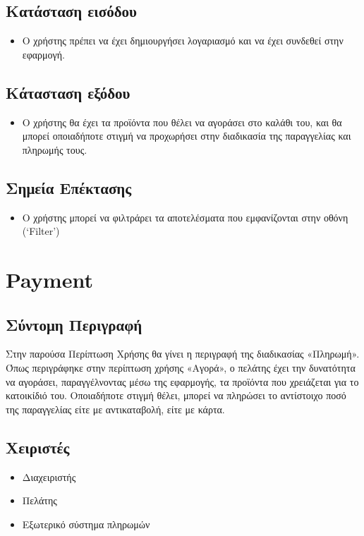 \documentclass[12pt,a4paper,twoside]{book}
\begin{document}
\subsection{Κατάσταση εισόδου} %
\begin{itemize}
  \item Ο χρήστης πρέπει να έχει δημιουργήσει λογαριασμό και να έχει συνδεθεί στην εφαρμογή. %
\end{itemize}

\subsection{Κάτασταση εξόδου} %
\begin{itemize}
  \item Ο χρήστης θα έχει τα προϊόντα που θέλει να αγοράσει στο καλάθι του, και θα μπορεί οποιαδήποτε στιγμή να προχωρήσει στην διαδικασία της παραγγελίας και πληρωμής τους. %
\end{itemize}

\subsection{Σημεία Επέκτασης}
\begin{itemize}
  \item Ο χρήστης μπορεί να φιλτράρει τα αποτελέσματα που εμφανίζονται στην οθόνη (`Filter') %
\end{itemize}

\section{Payment} %

\subsection{Σύντομη Περιγραφή}
Στην παρούσα Περίπτωση Χρήσης θα γίνει η περιγραφή της διαδικασίας «Πληρωμή». Όπως περιγράφηκε στην περίπτωση χρήσης «Αγορά», ο πελάτης έχει την δυνατότητα να αγοράσει, παραγγέλνοντας μέσω της εφαρμογής, τα προϊόντα που χρειάζεται για το κατοικίδιό του. Οποιαδήποτε στιγμή θέλει, μπορεί να πληρώσει το αντίστοιχο ποσό της παραγγελίας είτε με αντικαταβολή, είτε με κάρτα. %

\subsection{Χειριστές}
\begin{itemize}
  \item Διαχειριστής
  \item Πελάτης
  \item Εξωτερικό σύστημα πληρωμών
\end{itemize}
\end{document}
